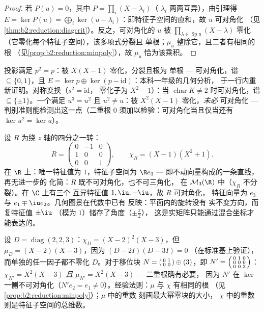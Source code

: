 \begin{proof}
若 $P(u) = 0$，其中 $P = \prod_{i}(X - \lambda_i)$（
$\lambda_i$ 两两互异），由引理得 $E = \ker P(u) = \bigoplus_i \ker(u -
\lambda_i)$：即特征子空间的直和，故 $u$ 可对角化
（见\cref{thm:b2:reduction:diagcrit}）。反之，可对角化的
$u$ 被 $\prod_{\lambda \in \operatorname{Sp}u}(X -
\lambda)$ 零化（它零化每个特征子空间），该多项式分裂且
单根；$\mu_u$ 整除它，且二者有相同的根
（见\cref{prop:b2:reduction:minpoly}），故 $\mu_u$ 恰为该乘积。
\end{proof}

\begin{example}\label{ex:b2:reduction:projections}
投影满足 $p^2 = p$：被 $X(X-1)$ 零化，分裂且根为
单根 --- 可对角化，谱 $\subseteq \{0, 1\}$，且 $E =
\ker p \oplus \ker(p - \mathrm{id})$：本科一年级的几何分析，
于一行内重新证明。对称变换（$s^2 = \mathrm{id}$，
零化子为 $X^2 - 1$）：当 $\operatorname{char} K
\neq 2$ 时可对角化，谱 $\subseteq \{\pm 1\}$。一个满足 $u^3 =
u^2$ 且 $u^2 \neq u$：被 $X^2(X - 1)$ 零化，\emph{未必}
可对角化 --- 判别准则能检测出这一点（二重根
$0$ 须加以检验：可对角化当且仅当还有 $\ker u^2 = \ker
u$）。
\end{example}

\begin{example}\label{ex:b2:reduction:rotation3d}
设 $R$ 为绕 $z$ 轴的四分之一转：
\[
R = \begin{pmatrix}
0 & -1 & 0\\
1 & 0 & 0\\
0 & 0 & 1
\end{pmatrix},
\qquad
\chi_R = (X - 1)(X^2 + 1).
\]
在 $\R$ 上：唯一特征值为 $1$，特征子空间为
$\R e_3$ --- 即不动向量构成的一条直线，再无进一步的
化简：$R$ 既不可对角化，也不可三角化，
在 $\mathcal{M}_3(\R)$ 中（$\chi_R$ 不分裂）。在 $\C$ 上有三个
互异特征值 $1, \iu, -\iu$，故 $R$ 可对角化，
特征向量为 $e_3$ 与 $e_1 \mp \iu e_2$。几何图景在代数中已有
反映：平面内的旋转没有
实不变方向，而复特征值 $\pm\iu$
（模为 $1$）储存了角度（$\pm\frac\pi2$），
这是实矩阵只能通过混合坐标才能表达的。
\end{example}

\begin{example}[极小多项式与特征多项式]\label{ex:b2:reduction:minvschar}
设 $D = \operatorname{diag}(2, 2, 3)$：$\chi_D = (X - 2)^2(X -
3)$，但 $\mu_D = (X - 2)(X - 3)$，因为 $(D - 2I)(D - 3I) = 0$
（在标准基上验证），而单独的任一因子都不零化
$D$。对于移位块 $N = \begin{psmallmatrix}0 & 1\\ 0 &
0\end{psmallmatrix} \oplus (3)$，即 $N' =
\begin{psmallmatrix}0 & 1 & 0\\ 0 & 0 & 0\\ 0 & 0 &
3\end{psmallmatrix}$：$\chi_{N'} = X^2(X - 3)$ \emph{且}
$\mu_{N'} = X^2(X - 3)$ --- 二重根确有必要，
因为 $N'$ 在 $\ker$ 一侧不可对角化（$N'e_2 =
e_1 \neq 0$）。经验法则：$\mu$ 与 $\chi$ 有相同的根
（见\cref{prop:b2:reduction:minpoly}）；$\mu$ 中的重数
刻画最大幂零块的大小，
$\chi$ 中的重数则是特征子空间的总维数。
\end{example}

